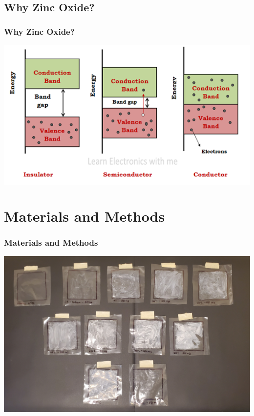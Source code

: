 \documentclass{beamer} %
\begin{document}
\subsection{Why Zinc Oxide?}
\begin{frame}\centering
  \frametitle{Why Zinc Oxide?}
  \includegraphics[scale = 0.5]{bandgap.png}
\end{frame}

\section{Materials and Methods}
\begin{frame}\centering
  \frametitle{Materials and Methods}
  \includegraphics[scale = 0.1]{Sunscreens.jpg}
\end{frame}
\end{document}
